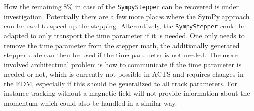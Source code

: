 How the remaining 8\% in case of the \texttt{SympyStepper} can be recovered is under investigation. Potentially there are a few more places where the SymPy approach can be used to speed up the stepping. Alternatively, the \texttt{SympyStepper} could be adapted to only transport the time parameter if it is needed. One only needs to remove the time parameter from the stepper math, the additionally generated stepper code can then be used if the time parameter is not needed. The more involved architectural problem is how to communicate if the time parameter is needed or not, which is currently not possible in ACTS and requires changes in the EDM, especially if this should be generalized to all track parameters. For instance tracking without a magnetic field will not provide information about the momentum which could also be handled in a similar way.
